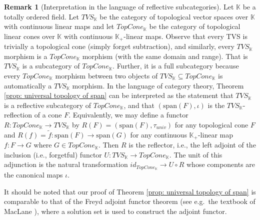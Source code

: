 \documentclass[a4paper,11pt]{article}
\numberwithin{equation}{section}
\theoremstyle{definition}
\newtheorem{Remark}[Definition]{Remark}
\theoremstyle{plain}
\newcommand{\spn}{\mathrm{span}}
\begin{document}
\begin{Remark}[Interpretation in the language of reflective subcategories]
    Let $\mathbb{K}$ be a totally ordered field. Let $TVS_{\mathbb{K}}$ be the category of topological vector spaces over $\mathbb{K}$ with continuous linear maps and let $TopCone_{\mathbb{K}}$ be the category of topological linear cones over $\mathbb{K}$ with continuous $\mathbb{K}_{+}$-linear maps. Observe that every TVS is trivially a topological cone (simply forget subtraction), and similarly, every $TVS_{\mathbb{K}}$ morphism is a $TopCone_{\mathbb{K}}$ morphism (with the same domain and range). That is $TVS_{\mathbb{K}}$ is a subcategory of $TopCone_{\mathbb{K}}$. Further, it is a full subcategory because every $TopCone_{\mathbb{K}}$ morphism between two objects of $TVS_{\mathbb{K}} \subseteq TopCone_{\mathbb{K}}$ is automatically a $TVS_{\mathbb{K}}$ morphism. In the language of category theory, Theorem \ref{prop: universal topology of span} can be interpreted as the statement that $TVS_{\mathbb{K}}$ is a reflective subcategory of $TopCone_{\mathbb{K}}$, and that $(\spn(F),\iota)$ is the $TVS_{\mathbb{K}}$-reflection of a cone $F$. Equivalently, we may define a functor $R: TopCone_{\mathbb{K}} \longrightarrow TVS_{\mathbb{K}}$ by
    $R(F) = (\spn(F), \tau_{univ})$ for any topological cone $F$ and $R(f) = \tilde{f}:\spn(F) \to \spn(G)$ for any continuous $\mathbb{K}_{+}$-linear map $f: F \longrightarrow G$ where $G \in TopCone_{\mathbb{K}}$. Then $R$ is the reflector, i.e., the left adjoint of the inclusion (i.e., forgetful) functor $U: TVS_{\mathbb{K}} \longrightarrow TopCone_{\mathbb{K}}$. The unit of this adjunction is the natural transformation $id_{TopCone_{\mathbb{K}}} \longrightarrow U\circ R$ whose components are the canonical maps $\iota$.

    It should be noted that our proof of Theorem \ref{prop: universal topology of span} is comparable to that of the Freyd adjoint functor theorem (see e.g.\ the textbook of MacLane \cite[Sec.\ V.6, Thm.\ 2]{MacLane}), where a solution set is used to construct the adjoint functor.
\end{Remark}
\end{document}
